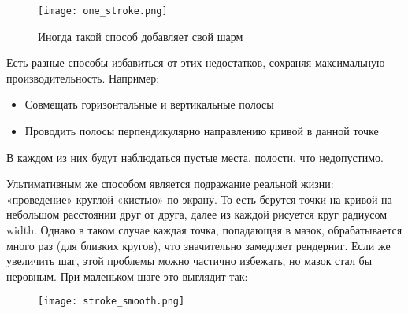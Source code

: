 \begin{figure}[h!]
    \centering
    \texttt{[image: one\_stroke.png]}
    \caption{Иногда такой способ добавляет свой шарм}
    \label{fig:pretty_vert_stroke}
\end{figure}

Есть разные способы избавиться от этих недостатков, сохраняя максимальную производительность.
Например:
\begin{itemize}
    \item Совмещать горизонтальные и вертикальные полосы
    \item Проводить полосы перпендикулярно направлению кривой в данной точке
\end{itemize}
В каждом из них будут наблюдаться пустые места, полости, что недопустимо.

Ультимативным же способом является подражание реальной жизни: «проведение» круглой «кистью» по экрану.
То есть берутся точки на кривой на небольшом расстоянии друг от друга, далее из каждой рисуется круг радиусом width.
Однако в таком случае каждая точка, попадающая в мазок, обрабатывается много раз (для близких кругов), что значительно замедляет рендерниг.
Если же увеличить шаг, этой проблемы можно частично избежать, но мазок стал бы неровным.
При маленьком шаге это выглядит так:
\begin{figure}[h!]
    \centering
    \texttt{[image: stroke\_smooth.png]}
    \label{fig:smooth_stroke}
\end{figure}

